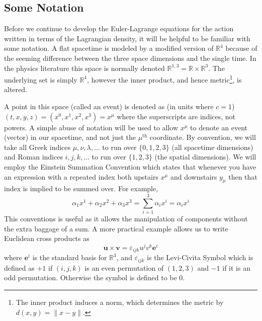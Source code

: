 \subsection{Some Notation}\label{sec:notation}
Before we continue to develop the Euler-Lagrange equations for the action
written in terms of the Lagrangian density, it will be helpful to be familiar
with some notation. A flat spacetime is modeled by a modified version of
\(\mathbb{R}^4\) because of the seeming difference between the three space
dimensions and the single time. In the physics literature this space is normally
denoted \(\mathbb{R}^{1,3} = \mathbb{R}\times\mathbb{R}^3\). The underlying set
is simply \(\mathbb{R}^4\), however the inner product, and hence
metric\footnote{The inner product induces a norm, which determines the metric by
\(d(x,y) = \|x - y\|\).}, is altered.

A point in this space (called an event) is denoted as (in units where \(c = 1\))
\((t, x, y, z) = (x^0, x^1, x^2, x^3) = x^\mu\) where the superscripts are
indices, not powers. A simple abuse of notation will be used to allow \(x^\mu\)
to denote an event (vector) in our spacetime, and not just the \(\mu^\text{th}\)
coordinate. By convention, we will take all Greek indices
\(\mu, \nu, \lambda, \ldots\) to run over \(\{0,1,2,3\}\) (all spacetime
dimensions) and Roman indices \(i, j, k, \ldots\) to run over \(\{1,2,3\}\)
(the spatial dimensions). We will employ the Einstein Summation Convention which
states that whenever you have an expression with a repeated index both upstairs
\(x^\mu\) and downstairs \(y_\mu\) then that index is implied to be summed over.
For example,
\begin{equation}
    \alpha_1x^1 + \alpha_2x^2 + \alpha_3x^3 = \sum_{i = 1}^3\alpha_i x^i = \alpha_i x^i
\end{equation}
This conventions is useful as it allows the manipulation of components without
the extra baggage of a sum. A more practical example allows us to write
Euclidean cross products as
\begin{equation}
    \mathbf{u}\times\mathbf{v} = \varepsilon_{ijk}u^j v^k\mathbf{e}^i
\end{equation}
where \(\mathbf{e}^i\) is the standard basis for \(\mathbb{R}^3\), and
\(\varepsilon_{ijk}\) is the Levi-Civita Symbol which is defined as \(+1\) if
\((i, j, k)\) is an even permutation of \((1,2,3)\) and \(-1\) if it is an odd
permutation. Otherwise the symbol is defined to be 0.

